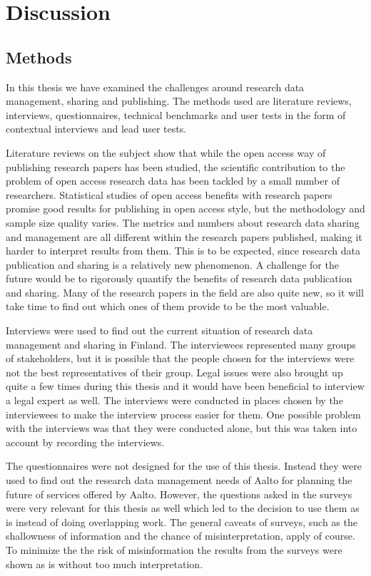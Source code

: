 \chapter{Discussion}
\label{chapter:discussion}

\section{Methods}

In this thesis we have examined the challenges around research data management,
sharing and publishing. The methods used are literature reviews,
interviews, questionnaires, technical benchmarks and user tests in the form of contextual
interviews and lead user tests.

Literature reviews on the subject show that while the open access way of
publishing research papers has been studied, the scientific contribution to
the problem of open access research data has been tackled by a small number
of researchers. Statistical studies of open access benefits with research
papers promise good results for publishing in open access style, but the
methodology and sample size quality varies. The metrics and numbers about
research data sharing and management are all different within the research
papers published, making it harder to interpret results from them. This is to
be expected, since research data publication and sharing is a relatively new
phenomenon. A challenge for the future would be to rigorously quantify the
benefits of research data publication and sharing. Many of the research papers
in the field are also quite new, so it will take time to find out which ones
of them provide to be the most valuable.

Interviews were used to find out the current situation of research data
management and sharing in Finland. The interviewees represented many groups
of stakeholders, but it is possible that the people chosen for the interviews
were not the best representatives of their group. Legal issues were also
brought up quite a few times during this thesis and it would have been
beneficial to interview a legal expert as well. The interviews were conducted
in places chosen by the interviewees to make the interview process easier
for them. One possible problem with the interviews was that they were
conducted alone, but this was taken into account by recording the interviews.

The questionnaires were not designed for the use of this thesis. Instead they were used
to find out the research data management needs of Aalto for planning the
future of services offered by Aalto. However, the questions asked in the
surveys were very relevant for this thesis as well which led to the decision
to use them as is instead of doing overlapping work. The general caveats of
surveys, such as the shallowness of information and the chance of
misinterpretation, apply of course. To minimize the the risk of misinformation
the results from the surveys were shown as is without too much interpretation.

